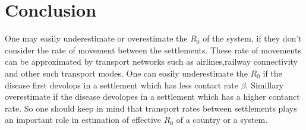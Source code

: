\documentclass{article}
\begin{document}
\section*{Conclusion}
One may easily underestimate or overestimate the $R_{0}$ of the
system, if they don't consider the rate of movement between the
settlements. These rate of movements can be approximated by transport
networks such as airlines,railway connectivity and other such
transport modes. One can easily underestimate the $R_{0}$ if the
disease first devolops in a settlement which has less contact rate
$\beta$. Simillary overestimate if the disease devolopes in a
settlement which has a higher contanct rate. So one should keep in
mind that transport rates between settlements plays an important role
in estimation of effective $R_{0}$ of a country or a system.
\end{document}
